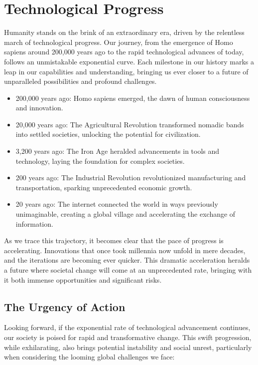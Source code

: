 \section{Technological Progress}\label{sec:technological-progress}
Humanity stands on the brink of an extraordinary era, driven by the relentless march of technological progress.
Our journey, from the emergence of Homo sapiens around 200,000 years ago to the rapid technological advances of today, follows an unmistakable exponential curve.
Each milestone in our history marks a leap in our capabilities and understanding, bringing us ever closer to a future of unparalleled possibilities and profound challenges.

\begin{itemize}
\item 200,000 years ago: Homo sapiens emerged, the dawn of human consciousness and innovation.
\item 20,000 years ago: The Agricultural Revolution transformed nomadic bands into settled societies, unlocking the potential for civilization.
\item 3,200 years ago: The Iron Age heralded advancements in tools and technology, laying the foundation for complex societies.
\item 200 years ago: The Industrial Revolution revolutionized manufacturing and transportation, sparking unprecedented economic growth.
\item 20 years ago: The internet connected the world in ways previously unimaginable, creating a global village and accelerating the exchange of information.
\end{itemize}
As we trace this trajectory, it becomes clear that the pace of progress is accelerating.
Innovations that once took millennia now unfold in mere decades, and the iterations are becoming ever quicker.
This dramatic acceleration heralds a future where societal change will come at an unprecedented rate, bringing with it both immense opportunities and significant risks.

\subsection*{The Urgency of Action}
Looking forward, if the exponential rate of technological advancement continues, our society is poised for rapid and transformative change.
This swift progression, while exhilarating, also brings potential instability and social unrest, particularly when considering the looming global challenges we face:

